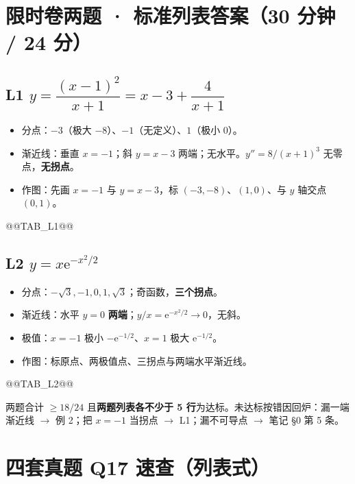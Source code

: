 \documentclass[11pt,a4paper]{ctexart}
\newcommand{\ee}{\mathrm{e}}
\begin{document}
\section{限时卷两题 · 标准列表答案（30 分钟 / 24 分）}

\subsection{L1 $y=\dfrac{(x-1)^2}{x+1}=x-3+\dfrac4{x+1}$}

\begin{itemize}[label=$\bullet$,leftmargin=1.5em]
\item 分点：$-3$（极大 $-8$）、$-1$（无定义）、$1$（极小 $0$）。
\item 渐近线：垂直 $x=-1$；斜 $y=x-3$ 两端；无水平。$y''=8/(x+1)^3$ 无零点，\textbf{无拐点}。
\item 作图：先画 $x=-1$ 与 $y=x-3$，标 $(-3,-8)$、$(1,0)$、与 $y$ 轴交点 $(0,1)$。
\end{itemize}

@@TAB_L1@@

\subsection{L2 $y=x\ee^{-x^2/2}$}

\begin{itemize}[label=$\bullet$,leftmargin=1.5em]
\item 分点：$-\sqrt3,-1,0,1,\sqrt3$；奇函数，\textbf{三个拐点}。
\item 渐近线：水平 $y=0$ \textbf{两端}；$y/x=\ee^{-x^2/2}\to0$，无斜。
\item 极值：$x=-1$ 极小 $-\ee^{-1/2}$、$x=1$ 极大 $\ee^{-1/2}$。
\item 作图：标原点、两极值点、三拐点与两端水平渐近线。
\end{itemize}

@@TAB_L2@@

\begin{warnbox}[验收线]
两题合计 $\ge 18/24$ 且\textbf{两题列表各不少于 5 行}为达标。未达标按错因回炉：漏一端渐近线 $\to$ 例 2；把 $x=-1$ 当拐点 $\to$ L1；漏不可导点 $\to$ 笔记 \S 0 第 5 条。
\end{warnbox}

\section{四套真题 Q17 速查（列表式）}
\end{document}
